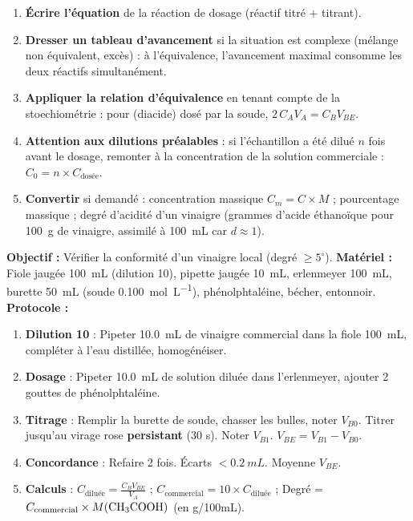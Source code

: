 \documentclass[11pt]{article}
\begin{document}
\begin{methode}
\begin{enumerate}
\item \textbf{Écrire l'équation} de la réaction de dosage (réactif titré + titrant).
\item \textbf{Dresser un tableau d'avancement} si la situation est complexe (mélange non équivalent, excès) : à l'équivalence, l'avancement maximal consomme les deux réactifs simultanément.
\item \textbf{Appliquer la relation d'équivalence} en tenant compte de la stoechiométrie : pour  (diacide) dosé par la soude, $2\,C_A V_A = C_B V_{BE}$.
\item \textbf{Attention aux dilutions préalables} : si l'échantillon a été dilué $n$ fois avant le dosage, remonter à la concentration de la solution commerciale : $C_0 = n \times C_{\text{dosée}}$.
\item \textbf{Convertir} si demandé : concentration massique $C_m = C \times M$ ; pourcentage massique ; degré d'acidité d'un vinaigre (grammes d'acide éthanoïque pour \SI{100}{g} de vinaigre, assimilé à \SI{100}{mL} car $d \approx 1$).
\end{enumerate}
\end{methode}

\begin{experience}
\textbf{Objectif :} Vérifier la conformité d'un vinaigre local (degré $\ge 5^\circ$).
\textbf{Matériel :} Fiole jaugée \SI{100}{mL} (dilution 10), pipette jaugée \SI{10}{mL}, erlenmeyer \SI{100}{mL}, burette \SI{50}{mL} (soude \SI{0,100}{mol.L^{-1}}), phénolphtaléine, bécher, entonnoir.
\textbf{Protocole :}
\begin{enumerate}
\item \textbf{Dilution 10} : Pipeter \SI{10,0}{mL} de vinaigre commercial dans la fiole \SI{100}{mL}, compléter à l'eau distillée, homogénéiser.
\item \textbf{Dosage} : Pipeter \SI{10,0}{mL} de solution diluée dans l'erlenmeyer, ajouter 2 gouttes de phénolphtaléine.
\item \textbf{Titrage} : Remplir la burette de soude, chasser les bulles, noter $V_{B0}$. Titrer jusqu'au virage rose \textbf{persistant} (30 s). Noter $V_{B1}$. $V_{BE} = V_{B1} - V_{B0}$.
\item \textbf{Concordance} : Refaire 2 fois. Écarts $< \SI{0,2}{mL}$. Moyenne $V_{BE}$.
\item \textbf{Calculs} : $C_{\text{diluée}} = \frac{C_B V_{BE}}{V_A}$ ; $C_{\text{commercial}} = 10 \times C_{\text{diluée}}$ ; Degré = $C_{\text{commercial}} \times M(\ce{CH3COOH})$ (en g/100mL).
\end{enumerate}
\end{experience}
\end{document}
